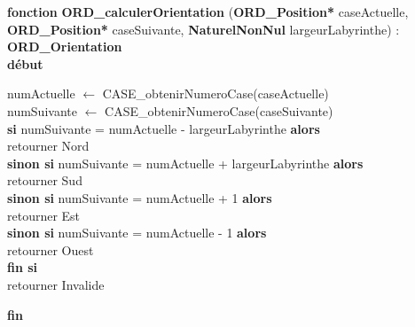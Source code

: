 \documentclass[a4paper, 11pt]{article}
\begin{document}
\noindent\textbf{fonction} \textbf{ORD\_calculerOrientation} (\textbf{ORD\_Position*} caseActuelle, \textbf{ORD\_Position*} caseSuivante, \textbf{NaturelNonNul} largeurLabyrinthe) : \textbf{ORD\_Orientation}\\
\textbf{début}
\begin{flushleft}
    \hspace*{1cm}numActuelle $\gets$ CASE\_obtenirNumeroCase(caseActuelle)\\
    \hspace*{1cm}numSuivante $\gets$ CASE\_obtenirNumeroCase(caseSuivante)\\
    \hspace*{1cm}\textbf{si} numSuivante = numActuelle - largeurLabyrinthe \textbf{alors}\\
    \hspace*{2cm}retourner Nord\\
    \hspace*{1cm}\textbf{sinon si} numSuivante = numActuelle + largeurLabyrinthe \textbf{alors}\\
    \hspace*{2cm}retourner Sud\\
    \hspace*{1cm}\textbf{sinon si} numSuivante = numActuelle + 1 \textbf{alors}\\
    \hspace*{2cm}retourner Est\\
    \hspace*{1cm}\textbf{sinon si} numSuivante = numActuelle - 1 \textbf{alors}\\
    \hspace*{2cm}retourner Ouest\\
    \hspace*{1cm}\textbf{fin si}\\
    \hspace*{1cm}retourner Invalide
\end{flushleft}
\textbf{fin}\\
\end{document}
